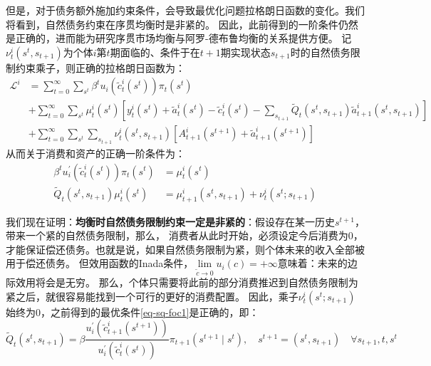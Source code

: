 但是，对于债务额外施加约束条件，会导致最优化问题拉格朗日函数的变化。我们将看到，自然债务约束在序贯均衡时是非紧的。
因此，此前得到的一阶条件仍然是正确的，进而能为研究序贯市场均衡与阿罗-德布鲁均衡的关系提供方便。
记$\nu_t^i\left(s^t,s_{t+1}\right)$为个体$i$第$t$期面临的、条件于在$t+1$期实现状态$s_{t+1}$时的自然债务限制约束乘子，则正确的拉格朗日函数为：
\begin{equation*}
    \begin{aligned}
        \mathcal{L}^i & =\sum_{t=0}^{\infty} \sum_{s^t} \beta^t u_i\left(\tilde{c}_t^i\left(s^t\right)\right) \pi_t\left(s^t\right) \\
        &+\sum_{t=0}^{\infty} \sum_{s^t} \mu_t^i\left(s^t\right)
            \left[y_t^i\left(s^t\right)+\tilde{a}_t^i\left(s^t\right)-\tilde{c}_t^i\left(s^t\right)
                -\sum_{s_{t+1}} \tilde{Q}_t\left(s^t, s_{t+1}\right) \tilde{a}_{t+1}^i\left(s^t, s_{t+1}\right)\right]  \\
        &+ \sum_{t=0}^{\infty} \sum_{s^t} \sum_{s_{t+1}} \nu_t^i\left(s^t,s_{t+1}\right)
            \left[A_{t+1}^i\left(s^{t+1}\right)+\tilde{a}_{t+1}^i\left(s^{t+1}\right)\right]
        \end{aligned}
\end{equation*}
从而关于消费和资产的正确一阶条件为：
\begin{align}
    \beta^t u_i^{\prime}\left(\tilde{c}_t^i\left(s^t\right)\right) \pi_t\left(s^t\right) &= \mu_t^i\left(s^t\right) \\
    \tilde{Q}_t\left(s^t, s_{t+1}\right) \mu_t^i\left(s^t\right) &= \mu_{t+1}^i\left(s^t, s_{t+1}\right) + \nu_t^i\left(s^t;s_{t+1}\right)
\end{align}

我们现在证明：\textbf{均衡时自然债务限制约束一定是非紧的}：假设存在某一历史$s^{t+1}$，带来一个紧的自然债务限制，那么，
消费者从此时开始，必须设定今后消费为0，才能保证偿还债务。也就是说，如果自然债务限制为紧，则个体未来的收入全部被用于偿还债务。
但效用函数的Inada条件，$\lim\limits_{\tilde{c}\rightarrow 0}u_i\left(c\right)=+\infty$意味着：未来的边际效用将会是无穷。
那么，个体只需要将此前的部分消费推迟到自然债务限制为紧之后，就很容易能找到一个可行的更好的消费配置。
因此，乘子$\nu_t^i\left(s^t;s_{t+1}\right)$始终为0，之前得到的最优条件\ref{eq-sq-foc1}是正确的，即：
\begin{equation}    \label{eq-sq-foc2}
    \tilde{Q}_t\left(s^t, s_{t+1}\right) = 
        \beta \frac{u_i^{\prime}\left(\tilde{c}_{t+1}^i\left(s^{t+1}\right)\right)}
            {u_i^{\prime}\left(\tilde{c}_t^i\left(s^t\right)\right)} 
                \pi_{t+1}\left(s^{t+1} \mid s^t\right), \quad s^{t+1}=(s^t,s_{t+1}) \quad \forall s_{t+1}, t, s^t
\end{equation}

